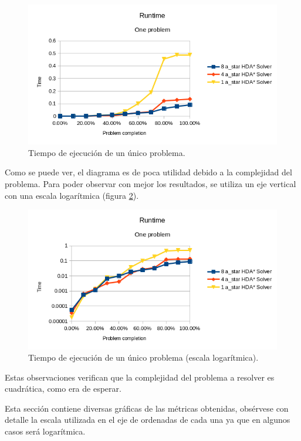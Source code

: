 \begin{figure}[h]
    \centering
    \includegraphics[width=\textwidth]{Media/Ch2/Runtime_One_Problem_Linear.png}
    \caption{Tiempo de ejecución de un único problema.}
    \label{fig:Runtime_One_Problem_Linear}
\end{figure}

Como se puede ver, el diagrama es de poca utilidad debido a la
complejidad del problema.
Para poder observar con mejor los resultados,
se utiliza un eje vertical con una escala logarítmica
(figura \ref{fig:Runtime_One_Problem_Log}).

\begin{figure}[h]
    \centering
    \includegraphics[width=\textwidth]{Media/Ch2/Runtime_One_Problem_Log.png}
    \caption{Tiempo de ejecución de un único problema (escala logarítmica).}
    \label{fig:Runtime_One_Problem_Log}
\end{figure}

Estas observaciones verifican que la complejidad del problema
a resolver es cuadrática, como era de esperar.

\begin{notebox}
    Esta sección contiene diversas gráficas de las métricas obtenidas,
    obsérvese con detalle la escala utilizada en el eje de ordenadas de cada una
    ya que en algunos casos será logarítmica.
\end{notebox}

